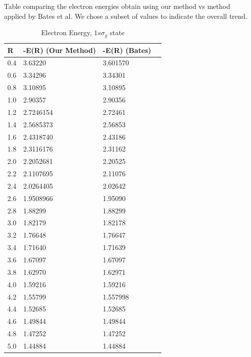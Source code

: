 Table comparing the electron  energies obtain using our method vs method applied by Bates et al. We chose a subset of values to indicate the overall trend.

  \begin{table}[ht]
  \caption{Electron Energy, $ 1s\sigma_g $ state}
  \centering
  \label{tab:UsVsBates1s}
    \begin{tabular}{ m{4em} m{4em}  m{4em}  m{4em} }
      \hline
      R & -E(R) (Our Method) & -E(R) (Bates)  \\ \hline \hline
      0.4 & 3.63220 & 3.601570 \\
      0.6 & 3.34296 & 3.34301 \\
      0.8 & 3.10895 & 3.10895 \\
      1.0 & 2.90357 & 2.90356 \\
      1.2 & 2.7246154 & 2.72461 \\
      1.4 & 2.5685373 & 2.56853 \\
      1.6 & 2.4318740 & 2.43186 \\
      1.8 & 2.3116176 & 2.31162 \\
      2.0 & 2.2052681 & 2.20525 \\
      2.2 & 2.1107695 & 2.11076 \\ 
      2.4 & 2.0264405 & 2.02642 \\
      2.6 & 1.9508966 & 1.95090 \\
      2.8 & 1.88299 & 1.88299 \\
      3.0 & 1.82179 & 1.82178 \\
      3.2 & 1.76648 & 1.76647 \\
      3.4 & 1.71640 & 1.71639 \\
      3.6 & 1.67097 & 1.67097  \\
      3.8 & 1.62970 & 1.62971  \\
      4.0 & 1.59216 & 1.59216  \\
      4.2 & 1.55799 & 1.557998 \\
      4.4 & 1.52685 & 1.52685 \\
      4.6 & 1.49844 & 1.49844 \\
      4.8 & 1.47252 & 1.47252 \\
      5.0 & 1.44884 & 1.44884 \\
      \hline
    \end{tabular}
  \end{table}

